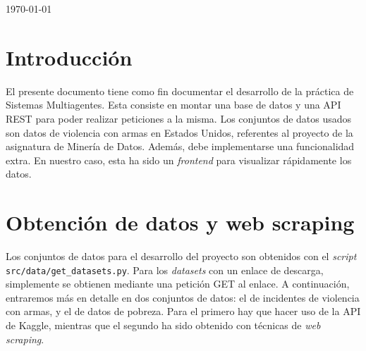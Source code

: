 \documentclass[11pt,a4paper]{article}
\begin{document}
\begin{titlepage}
	\vfill\vfill\vfill %
	
	{\large\today} %
	
	
	 
	
	\vfill %
	
\end{titlepage}


\tableofcontents

\newpage

\section{Introducción}

El presente documento tiene como fin documentar el desarrollo de la práctica de Sistemas Multiagentes. Esta consiste en montar una base de datos y una API REST para poder realizar peticiones a la misma. Los conjuntos de datos usados son datos de violencia con armas en Estados Unidos, referentes al proyecto de la asignatura de Minería de Datos. Además, debe implementarse una funcionalidad extra. En nuestro caso, esta ha sido un \textit{frontend} para visualizar rápidamente los datos.

\section{Obtención de datos y web scraping}

Los conjuntos de datos para el desarrollo del proyecto son obtenidos con el \textit{script} \lstinline!src/data/get_datasets.py!. Para los \textit{datasets} con un enlace de descarga, simplemente se obtienen mediante una petición GET al enlace. A continuación, entraremos más en detalle en dos conjuntos de datos: el de incidentes de violencia con armas, y el de datos de pobreza. Para el primero hay que hacer uso de la API de Kaggle, mientras que el segundo ha sido obtenido con técnicas de \textit{web scraping}. 
\end{document}
